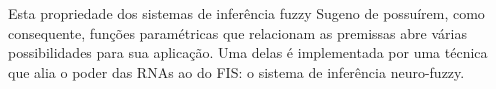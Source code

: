 Esta propriedade dos sistemas de inferência fuzzy Sugeno de possuírem, como consequente, funções paramétricas que relacionam as premissas abre várias possibilidades para sua aplicação. Uma delas é implementada por uma técnica que alia o poder das RNAs ao do FIS: o sistema de inferência neuro-fuzzy.



